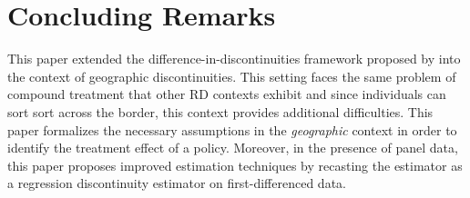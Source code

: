 \documentclass[12pt]{article}
\begin{document}
\section{Concluding Remarks}

This paper extended the difference-in-discontinuities framework proposed by \citet{Grembi_Nannicini_Troiano_2016} into the context of geographic discontinuities. This setting faces the same problem of compound treatment that other RD contexts exhibit and since individuals can sort sort across the border, this context provides additional difficulties. This paper formalizes the necessary assumptions in the \emph{geographic} context in order to identify the treatment effect of a policy. Moreover, in the presence of panel data, this paper proposes improved estimation techniques by recasting the estimator as a regression discontinuity estimator on first-differenced data. 









\setlength{\bibsep}{0.0pt}

\end{document}
